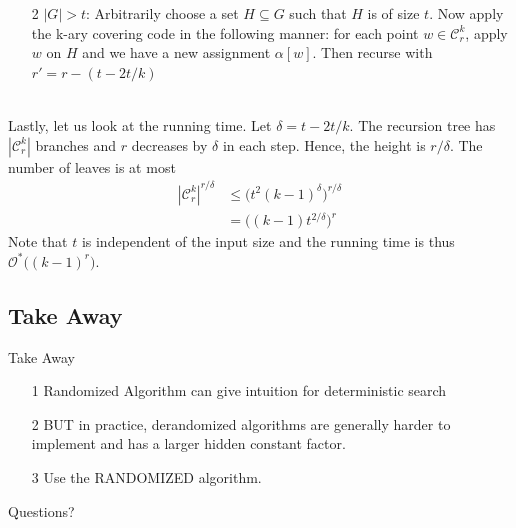 \documentclass[pdf] {beamer}
\newcommand{\cc}{\mathcal{C}}
\renewcommand{\O}{\mathcal{O}^*}
\begin{document}
	\begin{frame}
		\begin{enumerate}
			\item[2] $|G| > t$: Arbitrarily choose a set $H \subseteq G$ such that $H$ is of size $t$. Now apply the k-ary covering code in the following manner: for each point $w \in \cc_r^k$, apply $w$ on $H$ and we have a new assignment $\alpha[w]$. Then recurse with $r' = r - (t - 2t/k)$\\~\
		\end{enumerate}
	\end{frame}	
	\begin{frame}
		Lastly, let us look at the running time. Let $\delta = t - 2t/k$. The recursion tree has $|\cc_r^k|$ branches and $r$ decreases by $\delta$ in each step. Hence, the height is ${r/\delta}$. The number of leaves is at most
		\begin{align*}
		|\mathcal{C}_r^k|^{r/\delta} &\leq \big(t^{2}(k-1)^{\delta}\big)^{r/\delta}\\
		&= \big((k-1)t^{2/\delta}\big)^{r}
		\end{align*}
		Note that $t$ is independent of the input size and the running time is thus $\O\big((k-1)^r\big)$.
	\end{frame}

\subsection{Take Away}
\begin{frame}{Take Away}
	\begin{enumerate}
		\item[1] Randomized Algorithm can give intuition for deterministic search
		\item[2] BUT in practice, derandomized algorithms are generally harder to implement and has a larger hidden constant factor. 
		\item[3] Use the RANDOMIZED algorithm.
	\end{enumerate}
\end{frame}
	\begin{frame}
Questions?
\end{frame}
\end{document}
